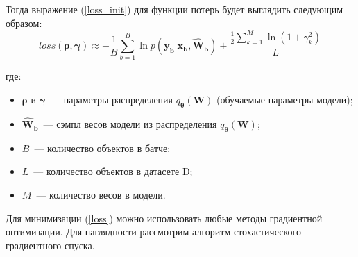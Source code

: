 \documentclass{article}
\numberwithin{equation}{section}
\begin{document}
    Тогда выражение (\ref{loss_init}) для функции потерь будет выглядить следующим образом:
    \begin{equation}\label{loss}
        loss(\pmb{\rho}, \pmb{\gamma})
        \approx
            - \frac{1}{B}
            \sum_{b=1}^{B}
                {\ln{
                    p(\pmb{y_{b}} | \pmb{x_{b}}, \pmb{\hat{W}_{b}})
                }
            }
            +
            \frac
                {
                    \frac{1}{2} \sum_{k=1}^{M} \ln(
                        {1 + \gamma_{k}^{2}}
                    )
                }
                {L}
    \end{equation}

    где:
    \begin{itemize}
        \item $\pmb{\rho}$ и $\pmb{\gamma}$~--- параметры распределения
            $q_{\pmb{\theta}}(\pmb{W})$ (обучаемые параметры модели);
        \item $\pmb{\hat{W}_{b}}$~--- сэмпл весов модели из распределения
            $q_{\pmb{\theta}}(\pmb{W})$;
        \item $B$~--- количество объектов в батче;
        \item $L$~--- количество объектов в датасете D;
        \item $M$~--- количество весов в модели.
    \end{itemize}

    Для минимизации (\ref{loss}) можно использовать любые методы градиентной оптимизации.
    Для наглядности рассмотрим алгоритм стохастического градиентного спуска.
\end{document}
